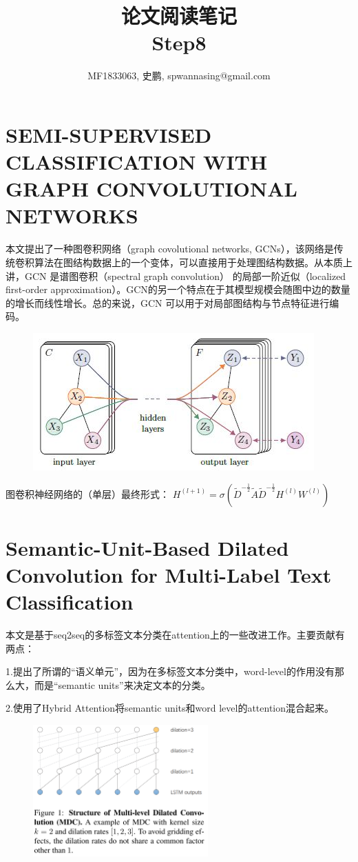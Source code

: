 \documentclass[a4paper,UTF8]{article}
\numberwithin{equation}{section}
\begin{document}
\title{论文阅读笔记\\
Step8}
\author{MF1833063, 史鹏, spwannasing@gmail.com}
\maketitle

\newpage
\section{SEMI-SUPERVISED CLASSIFICATION WITH GRAPH CONVOLUTIONAL NETWORKS}
本文提出了一种图卷积网络（graph covolutional networks, GCNs），该网络是传统卷积算法在图结构数据上的一个变体，可以直接用于处理图结构数据。从本质上讲，GCN 是谱图卷积（spectral graph convolution） 的局部一阶近似（localized first-order approximation）。GCN的另一个特点在于其模型规模会随图中边的数量的增长而线性增长。总的来说，GCN 可以用于对局部图结构与节点特征进行编码。
\begin{figure}[H]
	\centering
	\includegraphics[width=\textwidth]{1-1.jpg}
\end{figure}
图卷积神经网络的（单层）最终形式：
$H^{(l+1)}=\sigma\left(\tilde{D}^{-\frac{1}{2}} \tilde{A} \tilde{D}^{-\frac{1}{2}} H^{(l)} W^{(l)}\right)$

\newpage
\section{Semantic-Unit-Based Dilated Convolution for Multi-Label Text Classification}
本文是基于seq2seq的多标签文本分类在attention上的一些改进工作。主要贡献有两点：

1.提出了所谓的“语义单元”，因为在多标签文本分类中，word-level的作用没有那么大，而是“semantic units”来决定文本的分类。

2.使用了Hybrid Attention将semantic units和word level的attention混合起来。

\begin{figure}[H]
	\centering
	\includegraphics[width=0.6\textwidth]{2-1.png}
\end{figure}
\end{document}
